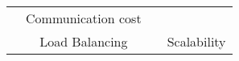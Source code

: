 \begin{table}[h]
\begin{center}
\begin{tabular}{|c|c||c|c|}
                                                                                                               & Communication cost                                                                 &                                                                                                                         &                                                                                                        \\ \cline{2-2} \cline{4-4} 
                                                                                                               & Load Balancing                                                                &                                                                                                                         &                                                                                                       Scalability \\ \hline
\end{tabular}

\end{center}
\end{table}
